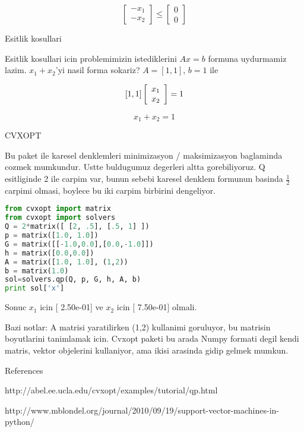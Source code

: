 \documentclass[12pt,fleqn]{article}
\begin{document}
\[ 
\left[ \begin{array}{c}
    -x_1 \\
    -x_2
\end{array} \right]
\leq
\left[ \begin{array}{c}
    0 \\
    0
\end{array} \right]
 \]

Esitlik kosullari

Esitlik kosullari icin problemimizin istediklerini $Ax = b$ formuna uydurmamiz
lazim. $x_1 + x_2$'yi nasil forma sokariz? $A = [1, 1]$, $b = 1$ ile

\[ 
[1, 1] \left[ \begin{array}{c}
    x_1 \\
    x_2
\end{array} \right] 
= 1 \\
 \]

\[ x_1 + x_2 = 1 \]

CVXOPT

Bu paket ile karesel denklemleri minimizasyon / maksimizasyon baglaminda cozmek
mumkundur. Ustte buldugumuz degerleri altta gorebiliyoruz. Q esitliginde 2 ile
carpim var, bunun sebebi karesel denklem formunun basinda $\frac{1}{2}$ carpimi
olmasi, boylece bu iki carpim birbirini dengeliyor.

\begin{lstlisting}[language=Python]
from cvxopt import matrix
from cvxopt import solvers
Q = 2*matrix([ [2, .5], [.5, 1] ])
p = matrix([1.0, 1.0])
G = matrix([[-1.0,0.0],[0.0,-1.0]])
h = matrix([0.0,0.0])
A = matrix([1.0, 1.0], (1,2))
b = matrix(1.0)
sol=solvers.qp(Q, p, G, h, A, b)
print sol['x']
\end{lstlisting}

Sonuc $x_1$ icin [ 2.50e-01] ve $x_2$ icin [ 7.50e-01] olmali.

Bazi notlar: A matrisi yaratilirken (1,2) kullanimi goruluyor, bu matrisin
boyutlarini tanimlamak icin. Cvxopt paketi bu arada Numpy formati degil kendi
matris, vektor objelerini kullaniyor, ama ikisi arasinda gidip gelmek mumkun. 

References

http://abel.ee.ucla.edu/cvxopt/examples/tutorial/qp.html

http://www.mblondel.org/journal/2010/09/19/support-vector-machines-in-python/
\end{document}
